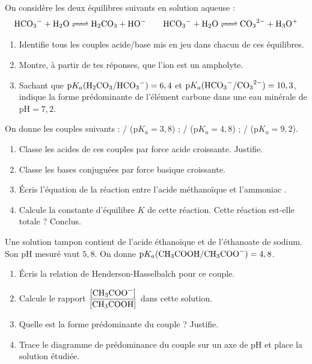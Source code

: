\documentclass[11pt]{article}
\newcounter{popsec}
\newcounter{popsub}
\newcommand{\courssub}[1]{%
  \stepcounter{popsub}%
  \par\vspace{9pt}\noindent{\popxbold\fontsize{11.5}{13}\selectfont\color{popink}{\color{poporange}\thepopsec.\thepopsub}\hspace{6pt}#1}\par\nopagebreak\vspace{4pt}
}
\begin{document}
\courssub{Je m'entraîne}

\begin{exercice}
On considère les deux équilibres suivants en solution aqueuse :
\[ \ce{HCO3- + H2O <=> H2CO3 + HO-} \qquad \ce{HCO3- + H2O <=> CO3^2- + H3O+} \]
\begin{enumerate}
\item Identifie tous les couples acide/base mis en jeu dans chacun de ces équilibres.
\item Montre, à partir de tes réponses, que l'ion  est un ampholyte.
\item Sachant que $\mathrm{p}K_a(\ce{H2CO3}/\ce{HCO3-}) = 6,4$ et $\mathrm{p}K_a(\ce{HCO3-}/\ce{CO3^2-}) = 10,3$, indique la forme prédominante de l'élément carbone dans une eau minérale de $\mathrm{pH} = 7,2$.
\end{enumerate}
\end{exercice}

\begin{exercice}
On donne les couples suivants : / ($\mathrm{p}K_a = 3,8$) ; / ($\mathrm{p}K_a = 4,8$) ; / ($\mathrm{p}K_a = 9,2$).
\begin{enumerate}
\item Classe les acides de ces couples par force acide croissante. Justifie.
\item Classe les bases conjuguées par force basique croissante.
\item Écris l'équation de la réaction entre l'acide méthanoïque  et l'ammoniac .
\item Calcule la constante d'équilibre $K$ de cette réaction. Cette réaction est-elle totale ? Conclus.
\end{enumerate}
\end{exercice}

\begin{exercice}
Une solution tampon contient de l'acide éthanoïque et de l'éthanoate de sodium. Son pH mesuré vaut $5,8$. On donne $\mathrm{p}K_a(\ce{CH3COOH}/\ce{CH3COO-}) = 4,8$.
\begin{enumerate}
\item Écris la relation de Henderson-Hasselbalch pour ce couple.
\item Calcule le rapport $\dfrac{[\ce{CH3COO-}]}{[\ce{CH3COOH}]}$ dans cette solution.
\item Quelle est la forme prédominante du couple ? Justifie.
\item Trace le diagramme de prédominance du couple sur un axe de pH et place la solution étudiée.
\end{enumerate}
\end{exercice}
\end{document}
